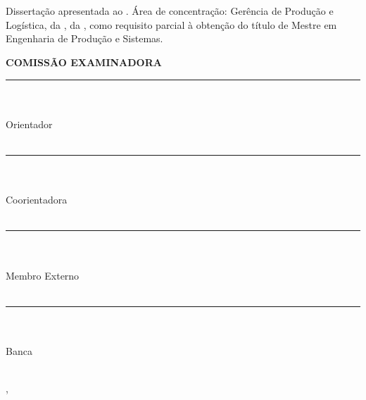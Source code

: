 \begin{center}
    {\MakeUppercase{\textbf{\aluno}} \\ [1cm]

    \MakeUppercase{\textbf{\titulo}} \\ [1cm]

    \hspace{.45\textwidth} %
        \begin{minipage}{.5\textwidth}
        \noindent Dissertação apresentada ao \curso. Área de concentração: Gerência de Produção e Logística, da \departamento, da \universidade, como requisito parcial à obtenção do título de Mestre em Engenharia de Produção e Sistemas. \\ [5mm]
        \end{minipage}
    \textbf{COMISSÃO EXAMINADORA} \\ [1cm]
    
    \rule{5cm}{.1mm} \\ \orientador \\ Orientador\\ \universidade \\ [5mm]

    \rule{5cm}{.1mm} \\ \coorientador \\ Coorientadora \\ \universidade \\ [5mm]

    \rule{5cm}{.1mm} \\ \convidadoa \\ Membro Externo \\ \univconvidadoa \\ [5mm]
    
    \rule{5cm}{.1mm} \\ \convidadob \\ Banca \\ \univconvidadob \\ [5mm]
    
    \vfill
    
    \cidade, \datadefesa
    }
\end{center}
